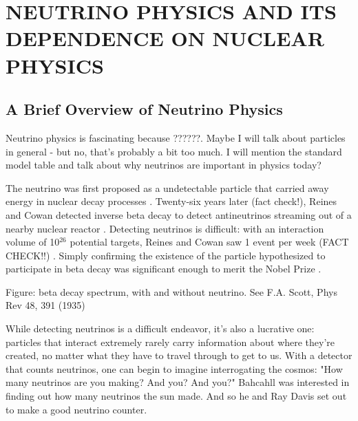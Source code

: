 %
%
%
%
%
%
%
%


%
%

\chapter{NEUTRINO PHYSICS AND ITS DEPENDENCE ON NUCLEAR PHYSICS}
\label{chap:0vbb}
\section{A Brief Overview of Neutrino Physics}
Neutrino physics is fascinating because ??????.
Maybe I will talk about particles in general - but no, that's probably a bit too much.
I will mention the standard model table and talk about why neutrinos are important in physics today?

The neutrino was first proposed as a undetectable particle that carried away energy in nuclear decay processes \cite{Pauli}.  Twenty-six years later (fact check!), Reines and Cowan detected inverse beta decay to detect antineutrinos streaming out of a nearby nuclear reactor \cite{poltergeist}.  Detecting neutrinos is difficult: with an interaction volume of 10$^{26}$ potential targets, Reines and Cowan saw 1 event per week (FACT CHECK!!) \cite{poltergeist}.  Simply confirming the existence of the particle hypothesized to participate in beta decay was significant enough to merit the Nobel Prize \cite{CowanNobel}.

Figure: beta decay spectrum, with and without neutrino.  See F.A. Scott, Phys Rev 48, 391 (1935)

While detecting neutrinos is a difficult endeavor, it's also a lucrative one: particles that interact extremely rarely carry information about where they're created, no matter what they have to travel through to get to us.  With a detector that counts neutrinos, one can begin to imagine interrogating the cosmos: "How many neutrinos are you making?  And you?  And you?"  Bahcahll was interested in finding out how many neutrinos the sun made.  And so he and Ray Davis set out to make a good neutrino counter. 

